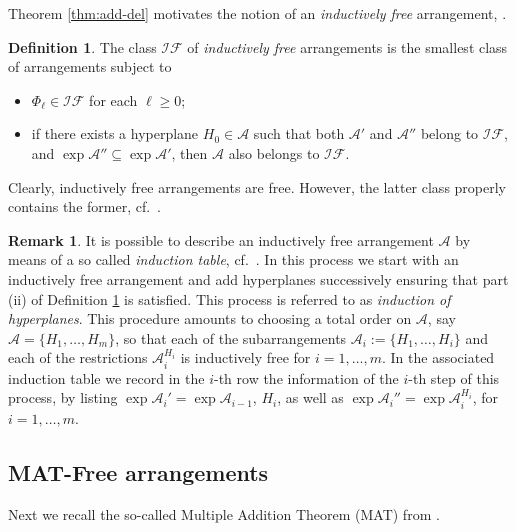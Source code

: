 \documentclass[12pt]{amsart}
\newcommand\CA{{\mathscr A}}
\newcommand\CIF{{\mathcal {IF}}}
\numberwithin{equation}{section}
\theoremstyle{plain}
\theoremstyle{definition}
\newtheorem{defn}[equation]{Definition}
\newtheorem{remark}[equation]{Remark}
\begin{document}
Theorem \ref{thm:add-del} motivates the notion of an
\emph{inductively free} arrangement,
\cite[Def.\ 4.53]{orlikterao:arrangements}.

\begin{defn}
	\label{def:indfree}
	The class $\CIF$ of \emph{inductively free} arrangements
	is the smallest class of arrangements subject to
	\begin{itemize}
		\item[(i)] $\Phi_\ell \in \CIF$ for each $\ell \ge 0$;
		\item[(ii)] if there exists a hyperplane $H_0 \in \CA$ such that both
		$\CA'$ and $\CA''$ belong to $\CIF$, and $\exp \CA '' \subseteq \exp \CA'$,
		then $\CA$ also belongs to $\CIF$.
	\end{itemize}
\end{defn}

Clearly, inductively free arrangements are free. However, the latter class properly contains the former, cf.~\cite[Ex.~4.59]{orlikterao:arrangements}.

\begin{remark}
	\label{rem:indfreetable}
	It is possible to describe an inductively free arrangement $\CA$ by means of
	a so called
	\emph{induction table}, cf.~\cite[\S 4.3, p.~119]{orlikterao:arrangements}.
	In this process we start with an inductively free arrangement
	and add hyperplanes successively ensuring that
	part (ii) of Definition \ref{def:indfree} is satisfied.
	This process is referred to as \emph{induction of hyperplanes}.
	This procedure amounts to
	choosing a total order on $\CA$, say
	$\CA = \{H_1, \ldots, H_m\}$,
	so that each of the subarrangements
	$\CA_i := \{H_1, \ldots, H_i\}$
	and each of the restrictions $\CA_i^{H_i}$ is inductively free
	for $i = 1, \ldots, m$.
	In the associated induction table we record in the $i$-th row the information
	of the $i$-th step of this process, by
	listing $\exp \CA_i' = \exp \CA_{i-1}$,
	$H_i$,
	as well as $\exp \CA_i'' = \exp \CA_i^{H_i}$,
	for $i = 1, \ldots, m$.
\end{remark}

\subsection{MAT-Free arrangements}
\label{ssect:MATfree}

Next we recall the so-called Multiple Addition Theorem (MAT)  from \cite{abeetall:weyl}.
\end{document}
